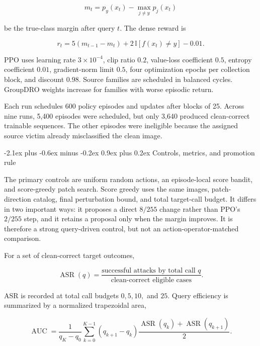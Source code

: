 \documentclass[11pt,a4paper]{article}
\makeatletter
\renewcommand\subsection{\@startsection{subsection}{2}{0pt}
  {-2.1ex plus -0.6ex minus -0.2ex}
  {0.9ex plus 0.2ex}
  {\normalfont\normalsize\bfseries\color{researchnavy}}}
\makeatother
\begin{document}
\begin{equation}
m_t=p_y(x_t)-\max_{j\neq y}p_j(x_t)
\end{equation}

be the true-class margin after query \(t\). The dense reward is

\begin{equation}
r_t
=
5(m_{t-1}-m_t)
+
2\,\mathbb{I}[f(x_t)\neq y]
-
0.01.
\label{eq:reward}
\end{equation}

PPO uses learning rate \(3\times10^{-4}\), clip ratio \(0.2\), value-loss coefficient \(0.5\), entropy coefficient \(0.01\), gradient-norm limit \(0.5\), four optimization epochs per collection block, and discount \(0.98\). Source families are scheduled in balanced cycles. GroupDRO weights increase for families with worse episodic return.

Each run schedules 600 policy episodes and updates after blocks of 25. Across nine runs, 5,400 episodes were scheduled, but only 3,640 produced clean-correct trainable sequences. The other episodes were ineligible because the assigned source victim already misclassified the clean image.

\subsection{Controls, metrics, and promotion rule}

The primary controls are uniform random actions, an episode-local score bandit, and score-greedy patch search. Score greedy uses the same images, patch-direction catalog, final perturbation bound, and total target-call budget. It differs in two important ways: it proposes a direct \(8/255\) change rather than PPO's \(2/255\) step, and it retains a proposal only when the margin improves. It is therefore a strong query-driven control, but not an action-operator-matched comparison.

For a set of clean-correct target outcomes,

\begin{equation}
\operatorname{ASR}(q)
=
\frac{
\text{successful attacks by total call }q
}{
\text{clean-correct eligible cases}
}.
\end{equation}

ASR is recorded at total call budgets \(0,5,10,\) and \(25\). Query efficiency is summarized by a normalized trapezoidal area,

\begin{equation}
\operatorname{AUC}
=
\frac{1}{q_K-q_0}
\sum_{k=0}^{K-1}
(q_{k+1}-q_k)
\frac{\operatorname{ASR}(q_k)+\operatorname{ASR}(q_{k+1})}{2}.
\label{eq:auc}
\end{equation}
\end{document}

